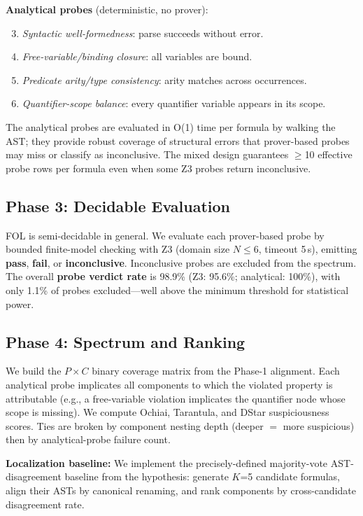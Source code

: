 \documentclass[11pt,letterpaper]{article}
\begin{document}
\textbf{Analytical probes} (deterministic, no prover):
\begin{enumerate}
  \setcounter{enumi}{2}
  \item \emph{Syntactic well-formedness}: parse succeeds without error.
  \item \emph{Free-variable/binding closure}: all variables are bound.
  \item \emph{Predicate arity/type consistency}: arity matches across occurrences.
  \item \emph{Quantifier-scope balance}: every quantifier variable appears in its scope.
\end{enumerate}

The analytical probes are evaluated in O(1) time per formula by walking the AST; they provide robust coverage of structural errors that prover-based probes may miss or classify as inconclusive. The mixed design guarantees $\geq$10 effective probe rows per formula even when some Z3 probes return inconclusive.

\subsection{Phase 3: Decidable Evaluation}
\label{sec:phase3}

FOL is semi-decidable in general. We evaluate each prover-based probe by bounded finite-model checking with Z3 (domain size $N\leq6$, timeout 5\,s), emitting \textbf{pass}, \textbf{fail}, or \textbf{inconclusive}. Inconclusive probes are excluded from the spectrum. The overall \textbf{probe verdict rate} is 98.9\% (Z3: 95.6\%; analytical: 100\%), with only 1.1\% of probes excluded—well above the minimum threshold for statistical power.

\subsection{Phase 4: Spectrum and Ranking}

We build the $P \times C$ binary coverage matrix from the Phase-1 alignment. Each analytical probe implicates all components to which the violated property is attributable (e.g., a free-variable violation implicates the quantifier node whose scope is missing). We compute Ochiai, Tarantula, and DStar suspiciousness scores. Ties are broken by component nesting depth (deeper $=$ more suspicious) then by analytical-probe failure count.

\textbf{Localization baseline:} We implement the precisely-defined majority-vote AST-disagreement baseline from the hypothesis: generate $K$=5 candidate formulas, align their ASTs by canonical renaming, and rank components by cross-candidate disagreement rate.
\end{document}
